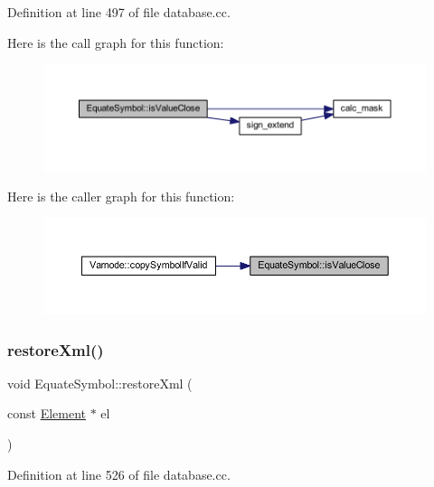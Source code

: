 Definition at line 497 of file database.\+cc.

Here is the call graph for this function\+:
\nopagebreak
\begin{figure}[H]
\begin{center}
\leavevmode
\includegraphics[width=350pt]{class_equate_symbol_a0e6f232ba80f3b57f66add5315881a4b_cgraph}
\end{center}
\end{figure}
Here is the caller graph for this function\+:
\nopagebreak
\begin{figure}[H]
\begin{center}
\leavevmode
\includegraphics[width=350pt]{class_equate_symbol_a0e6f232ba80f3b57f66add5315881a4b_icgraph}
\end{center}
\end{figure}
\mbox{\label{class_equate_symbol_ab4aa7cdacdd28777f82bf0be1ad55454}} 
\subsubsection{\texorpdfstring{restoreXml()}{restoreXml()}}
{\footnotesize\ttfamily void Equate\+Symbol\+::restore\+Xml (\begin{DoxyParamCaption}\item[{const \mbox{\hyperlink{class_element}{Element}} $\ast$}]{el }\end{DoxyParamCaption})\hspace{0.3cm}{\ttfamily [virtual]}}



Definition at line 526 of file database.\+cc.

